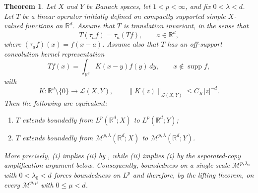 \documentclass[11pt]{article}
\newtheorem{theorem}{Theorem}[section]
\theoremstyle{definition}
\newcommand{\R}{\mathbb R}
\begin{document}
\begin{theorem}\label{thm:morrey-lp-equivalence-cz}
		Let $X$ and $Y$ be Banach spaces, let $1<p<\infty$, and fix $0<\lambda<d$.  Let $T$ be a linear operator initially defined on compactly supported simple $X$-valued functions on $\R^d$.  Assume that $T$ is translation invariant, in the sense that
		\[
		T(\tau_a f)=\tau_a(Tf),\qquad a\in\R^d,
		\]
		where $(\tau_a f)(x)=f(x-a)$.  Assume also that $T$ has an off-support convolution kernel representation
		\[
		Tf(x)=\int_{\R^d}K(x-y)f(y)\,dy,
		\qquad x\notin \operatorname{supp}f,
		\]
		with
		\[
		K:\R^d\setminus\{0\}\to\mathcal L(X,Y),
		\qquad
		\|K(z)\|_{\mathcal L(X,Y)}\le C_K |z|^{-d}.
		\]
		Then the following are equivalent:
		\begin{enumerate}[label=\textup{(\roman*)}]
			\item $T$ extends boundedly from $L^p(\R^d;X)$ to $L^p(\R^d;Y)$;
			\item $T$ extends boundedly from $\mathcal M^{p,\lambda}(\R^d;X)$ to $\mathcal M^{p,\lambda}(\R^d;Y)$.
		\end{enumerate}
		More precisely, \textup{(i)} implies \textup{(ii)} by , while \textup{(ii)} implies \textup{(i)} by the separated-copy amplification argument below. Consequently, boundedness on a single scale $\mathcal M^{p,\lambda_0}$ with $0<\lambda_0<d$ forces boundedness on $L^p$ and therefore, by the lifting theorem, on every $\mathcal M^{p,\mu}$ with $0\le\mu<d$.
	\end{theorem}
\end{document}
